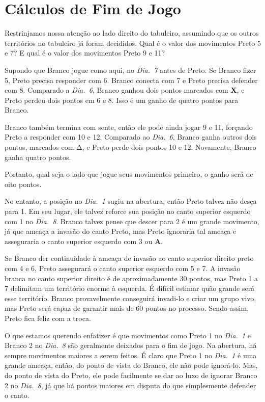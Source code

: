 \section{Cálculos de Fim de Jogo}

Restrinjamos nossa atenção ao lado direito do tabuleiro, assumindo que os outros territórios no tabuleiro já foram decididos. Qual é o valor dos movimentos Preto 5 e 7? E qual é o valor dos movimentos Preto 9 e 11?

Supondo que Branco jogue como aqui, no \emph{Dia.\@~7} antes de Preto. Se Branco fizer 5, Preto precisa responder com 6. Branco conecta com 7 e Preto precisa defender com 8. Comparado a \emph{Dia.\@~6}, Branco ganhou dois pontos marcados com \textbf{X}, e Preto perdeu dois pontos em 6 e 8. Isso é um ganho de quatro pontos para Branco.

Branco também termina com sente, então ele pode ainda jogar 9 e 11, forçando Preto a responder com 10 e 12. Comparado ao \emph{Dia.\@~6}, Branco ganha outros dois pontos, marcados com \(\increment\), e Preto perde dois pontos 10 e 12. Novamente, Branco ganha quatro pontos.

Portanto, qual seja o lado que jogue seus movimentos primeiro, o ganho será de oito pontos.

No entanto, a posição no \emph{Dia.\@~1} sugiu na abertura, então Preto talvez não desça para 1. Em seu lugar, ele talvez reforce sua posição no canto superior esquerdo com 1 no \emph{Dia.\@~8}. Branco talvez pense que descer para 2 é um grande movimento, já que ameaça a invasão do canto Preto, mas Preto ignoraria  tal ameaça e asseguraria o canto superior esquerdo com 3 ou \textbf{A}.

Se Branco der continuidade à ameaça de invasão ao canto superior direito preto com 4 e 6, Preto assegurará o canto superior esquerdo com 5 e 7. A invasão branca no canto superior direito é de aproximadamente 30 pontos, mas Preto 1 a 7 delimitam um território enorme à esquerda. É difícil estimar quão grande será esse território. Branco provavelmente conseguirá invadi-lo e criar um grupo vivo, mas Preto será capaz de garantir mais de 60 pontos no processo. Sendo assim, Preto fica feliz com a troca.

O que estamos querendo enfatizer é que movimentos como Preto 1 no \emph{Dia.\@~1} e Branco 2 no \emph{Dia.\@~8} são geralmente deixados para o fim de jogo. Na abertura, há sempre movimentos maiores a serem feitos. É claro que Preto 1 no \emph{Dia.\@~1} é uma grande ameaça, então, do ponto de vista do Branco, ele não pode ignorá-lo. Mas, do ponto de vista do Preto, ele pode facilmente se dar ao luxo de ignorar Branco 2 no \emph{Dia.\@~8}, já que há pontos maiores em disputa do que simplesmente defender o canto.

